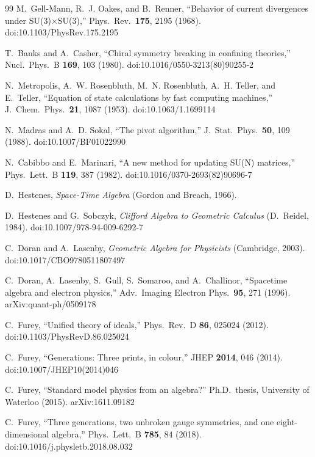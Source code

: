 \documentclass[12pt]{article}
\begin{document}
\begin{thebibliography}{99}
M.~Gell-Mann, R.~J. Oakes, and B.~Renner, ``Behavior of current divergences under SU(3)$\times$SU(3),'' Phys.\ Rev.\ \textbf{175}, 2195 (1968).  doi:10.1103/PhysRev.175.2195

T.~Banks and A.~Casher, ``Chiral symmetry breaking in confining theories,'' Nucl.\ Phys.\ B \textbf{169}, 103 (1980).  doi:10.1016/0550-3213(80)90255-2

N.~Metropolis, A.~W. Rosenbluth, M.~N. Rosenbluth, A.~H. Teller, and E.~Teller, ``Equation of state calculations by fast computing machines,'' J.\ Chem.\ Phys.\ \textbf{21}, 1087 (1953).  doi:10.1063/1.1699114

N.~Madras and A.~D. Sokal, ``The pivot algorithm,'' J.\ Stat.\ Phys.\ \textbf{50}, 109 (1988).  doi:10.1007/BF01022990

N.~Cabibbo and E.~Marinari, ``A new method for updating SU(N) matrices,'' Phys.\ Lett.\ B \textbf{119}, 387 (1982).  doi:10.1016/0370-2693(82)90696-7

D.~Hestenes, \textit{Space-Time Algebra} (Gordon and Breach, 1966).

D.~Hestenes and G.~Sobczyk, \textit{Clifford Algebra to Geometric Calculus} (D.~Reidel, 1984).  doi:10.1007/978-94-009-6292-7

C.~Doran and A.~Lasenby, \textit{Geometric Algebra for Physicists} (Cambridge, 2003).  doi:10.1017/CBO9780511807497

C.~Doran, A.~Lasenby, S.~Gull, S.~Somaroo, and A.~Challinor, ``Spacetime algebra and electron physics,'' Adv.\ Imaging Electron Phys.\ \textbf{95}, 271 (1996).  arXiv:quant-ph/0509178

C.~Furey, ``Unified theory of ideals,'' Phys.\ Rev.\ D \textbf{86}, 025024 (2012).  doi:10.1103/PhysRevD.86.025024

C.~Furey, ``Generations: Three prints, in colour,'' JHEP \textbf{2014}, 046 (2014).  doi:10.1007/JHEP10(2014)046

C.~Furey, ``Standard model physics from an algebra?'' Ph.D.\ thesis, University of Waterloo (2015).  arXiv:1611.09182

C.~Furey, ``Three generations, two unbroken gauge symmetries, and one eight-dimensional algebra,'' Phys.\ Lett.\ B \textbf{785}, 84 (2018).  doi:10.1016/j.physletb.2018.08.032


\end{thebibliography}
\end{document}
